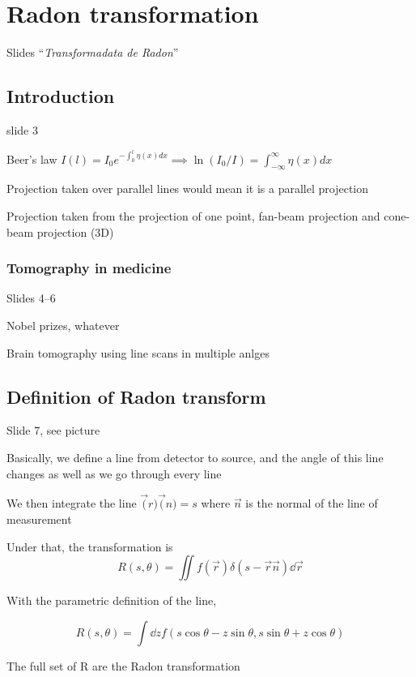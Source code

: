 \documentclass[../main/main.tex]{subfiles}
\begin{document}
\chapter{Radon transformation}

Slides ``\emph{Transformadata de Radon}''
\section{Introduction}
slide 3

Beer's law $I(l) = I_0 e^{- \int_0^l \eta(x) dx} \implies \ln(I_0/I) =\int_{-\infty}^{\infty} \eta(x) dx $

Projection taken over parallel lines would mean it is a parallel projection

Projection taken from the projection of one point, fan-beam projection and cone-beam projection (3D)

\subsection{Tomography in medicine}
Slides 4--6

Nobel prizes, whatever

Brain tomography using line scans in multiple anlges

\section{Definition of Radon transform}

Slide 7, see picture

Basically, we define a line from detector to source, and the angle of this line changes as well as we go through every line

We then integrate the line $\vec(r)\vec(n) = s$ where $\vec{n}$ is the normal of the line of measurement

Under that, the transformation is
\begin{equation}
	R(s, \theta) = \iint f(\vec r) \delta(s - \vec{r} \vec n )\dd{\vec r}
\end{equation}

With the parametric definition of the line,

\begin{equation}
	R(s, \theta) = \int \dd z f(s \cos \theta - z \sin \theta, s \sin \theta + z \cos \theta )
\end{equation}

The full set of R are the Radon transformation
\end{document}
